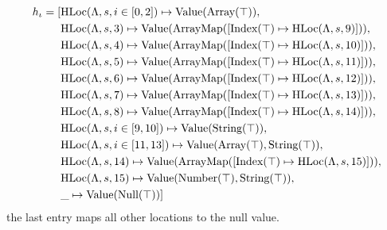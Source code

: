 \begin{align*}
h_\iota = [	&\text{HLoc}(\Lambda, s, i\in[0,2])\mapsto \text{Value}(\text{Array}(\top)),\notag\\
			&\text{HLoc}(\Lambda, s, 3)\mapsto \text{Value}(\text{ArrayMap}([\text{Index}(\top)\mapsto\text{HLoc}(\Lambda, s, 9)])),\notag\\
			&\text{HLoc}(\Lambda, s, 4)\mapsto \text{Value}(\text{ArrayMap}([\text{Index}(\top)\mapsto\text{HLoc}(\Lambda, s, 10)])),\notag\\
			&\text{HLoc}(\Lambda, s, 5)\mapsto \text{Value}(\text{ArrayMap}([\text{Index}(\top)\mapsto\text{HLoc}(\Lambda, s, 11)])),\notag\\			
			&\text{HLoc}(\Lambda, s, 6)\mapsto \text{Value}(\text{ArrayMap}([\text{Index}(\top)\mapsto\text{HLoc}(\Lambda, s, 12)])),\notag\\			
			&\text{HLoc}(\Lambda, s, 7)\mapsto \text{Value}(\text{ArrayMap}([\text{Index}(\top)\mapsto\text{HLoc}(\Lambda, s, 13)])),\notag\\			
			&\text{HLoc}(\Lambda, s, 8)\mapsto \text{Value}(\text{ArrayMap}([\text{Index}(\top)\mapsto\text{HLoc}(\Lambda, s, 14)])),\notag\\			
			&\text{HLoc}(\Lambda, s, i \in [9, 10])\mapsto \text{Value}(\text{String}(\top)),\notag\\
			&\text{HLoc}(\Lambda, s, i\in[11,13])\mapsto \text{Value}(\text{Array}(\top),\text{String}(\top)),\notag\\
			&\text{HLoc}(\Lambda, s, 14)\mapsto \text{Value}(\text{ArrayMap}([\text{Index}(\top)\mapsto\text{HLoc}(\Lambda, s, 15)])),\notag\\			
			&\text{HLoc}(\Lambda, s, 15)\mapsto \text{Value}(\text{Number}(\top),\text{String}(\top)),\notag\\
			&\_ \mapsto \text{Value}(\text{Null}(\top))]
\end{align*}
the last entry maps all other locations to the null value. 

